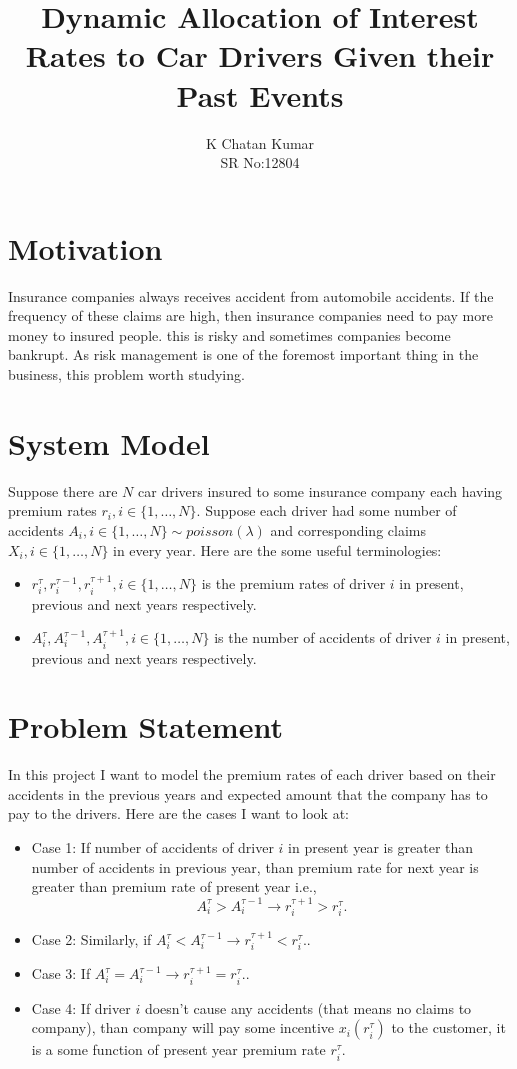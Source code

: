 \documentclass[a4paper,english,12pt]{article}
\title{\textbf{Dynamic Allocation of Interest Rates to Car Drivers Given their Past Events}}
\author{K Chatan Kumar\\SR No:12804}
\begin{document}
\maketitle

\section{Motivation}
Insurance companies always receives accident from automobile accidents. If the frequency of these claims are high, then insurance companies need to pay more money to insured people. this is risky and sometimes companies become bankrupt. As risk management is one of the foremost important thing in the business, this problem worth studying.

\section{System Model}
Suppose there are $N$ car drivers insured to some insurance company each having premium rates $r_i, i\in \{1, \dots, N\}$. Suppose each driver had some number of accidents $A_i, i\in\{1,\dots,N\} \sim poisson(\lambda)$ and corresponding claims $X_i, i\in\{1,\dots,N\}$ in every year. Here are the some useful terminologies:
\begin{itemize}
\item $r_i^\tau, r_i^{\tau-1}, r_i^{\tau+1}, i\in\{1,\dots,N\}$ is the premium rates of driver $i$ in present, previous and next years respectively.
\item $A_i^\tau, A_i^{\tau-1}, A_i^{\tau+1}, i\in\{1,\dots,N\}$ is the number of accidents of driver $i$ in present, previous and next years respectively.
\end{itemize}
\section{Problem Statement}
In this project I want to model the premium rates of each driver based on their accidents in the previous years and expected amount that the company has to pay to the drivers. Here are the cases I want to look at:

\begin{itemize}
\item Case 1: If number of accidents of driver $i$ in present year is greater than number of accidents in previous year, than premium rate for next year is greater than premium rate of present year i.e.,  
\begin{equation*}
A_i^\tau > A_i^{\tau-1} \rightarrow r_i^{\tau+1} > r_i^\tau.
\end{equation*}
\item Case 2: Similarly, if $ A_i^\tau < A_i^{\tau-1} \rightarrow r_i^{\tau+1} < r_i^\tau. $.
\item Case 3: If $ A_i^\tau = A_i^{\tau-1} \rightarrow r_i^{\tau+1} = r_i^\tau. $.
\item Case 4: If driver $i$ doesn't cause any accidents (that means no claims to company), than company will pay some incentive $x_i(r_i^\tau)$ to the customer, it is a some function of present year premium rate $r_i^\tau$.
\end{itemize}
\end{document}
